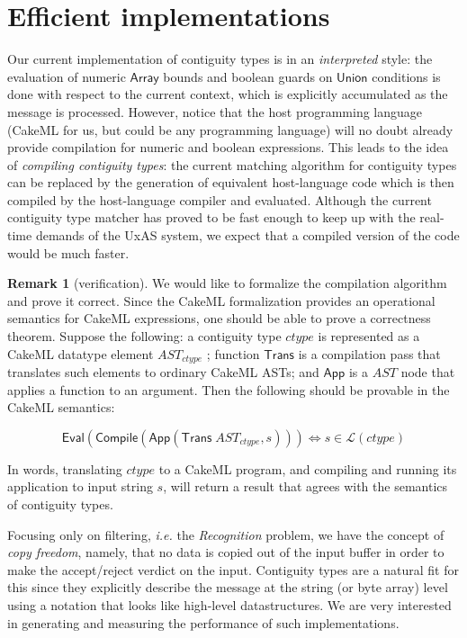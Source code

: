\documentclass{article}
\newcommand{\ie}{\textit{i.e.}}
\newcommand{\konst}[1]{\ensuremath{\mathsf{#1}}}
\newcommand{\Lang}[1]{\ensuremath{{\mathcal L}({#1})}}
\theoremstyle{definition}
\newtheorem{remark}{Remark}
\begin{document}
\section{Efficient implementations}

Our current implementation of contiguity types is in an
\emph{interpreted} style: the evaluation of numeric \konst{Array}
bounds and boolean guards on \konst{Union} conditions is done with
respect to the current context, which is explicitly accumulated as the
message is processed. However, notice that the host programming
language (CakeML for us, but could be any programming language) will
no doubt already provide compilation for numeric and boolean
expressions. This leads to the idea of \emph{compiling contiguity
  types}: the current matching algorithm for contiguity types can be
replaced by the generation of equivalent host-language code which is
then compiled by the host-language compiler and evaluated. Although
the current contiguity type matcher has proved to be fast enough to
keep up with the real-time demands of the UxAS system, we expect that
a compiled version of the code would be much faster.

\begin{remark} [verification] We would like to formalize the compilation
algorithm and prove it correct. Since the CakeML formalization
provides an operational semantics for CakeML expressions, one should
be able to prove a correctness theorem. Suppose the following: a
contiguity type $\mathit{ctype}$ is represented as a CakeML datatype
element $\mathit{AST}_{\mathit{ctype}}$ ; function $\konst{Trans}$ is
a compilation pass that translates such elements to ordinary CakeML
ASTs; and \konst{App} is a $\mathit{AST}$ node that applies a function
to an argument. Then the following should be provable in the CakeML
semantics:

\[
 \konst{Eval}(\konst{Compile} (\konst{App}(\konst{Trans}\; \mathit{AST}_\mathit{ctype},s))) \iff s \in \Lang{\mathit{ctype}}
\]

In words, translating $\mathit{ctype}$ to a CakeML program, and
compiling and running its application to input string $s$, will
return a result that agrees with the semantics of contiguity types.

\end{remark}

Focusing only on filtering, \ie{} the \emph{Recognition} problem, we
have the concept of \emph{copy freedom}, namely, that no data is copied
out of the input buffer in order to make the accept/reject verdict on
the input. Contiguity types are a natural fit for this since they
explicitly describe the message at the string (or byte array) level
using a notation that looks like high-level datastructures. We are
very interested in generating and measuring the performance of such
implementations.
\end{document}

